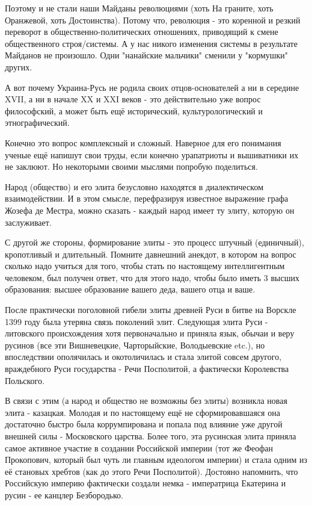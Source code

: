 \begin{itemize}
\begin{itemize}
Поэтому и не стали наши Майданы революциями (хоть На граните, хоть Оранжевой,
хоть Достоинства). Потому что, революция - это коренной и резкий переворот в
общественно-политических отношениях, приводящий к смене общественного
строя/системы. А у нас никого изменения системы в результате Майданов не
произошло. Одни "нанайские мальчики" сменили у "кормушки" других.

А вот почему Украина-Русь не родила своих отцов-основателей а ни в середине
XVII, а ни в начале XX и XXI веков - это действительно уже вопрос философский,
а может быть ещё исторический, культурологический и этнографический.

Конечно это вопрос комплексный и сложный. Наверное для его понимания ученые ещё
напишут свои труды, если конечно урапатриоты и вышиватники их не заклюют. Но
некоторыми своими мыслями попробую поделиться.

Народ (общество) и его элита безусловно находятся в диалектическом
взаимодействии. И в этом смысле, перефразируя известное выражение графа Жозефа
де Местра, можно сказать - каждый народ имеет ту элиту, которую он заслуживает.

С другой же стороны, формирование элиты - это процесс штучный (единичный),
кропотливый и длительный. Помните давнешний анекдот, в котором на вопрос
сколько надо учиться для того, чтобы стать по настоящему интеллигентным
человеком, был получен ответ, что для этого надо, чтобы было иметь 3 высших
образования: высшее образование вашего деда, вашего отца и ваше.

После практически поголовной гибели элиты древней Руси в битве на Ворскле 1399
году была утеряна связь поколений элит. Следующая элита Руси - литовского
происхождения хотя первоначально и приняла язык, обычаи и веру русинов (все эти
Вишневецкие, Чарторыйские, Володыевские etc.), но впоследствии ополячилась и
окотоличилась и стала элитой совсем другого, враждебного Руси государства -
Речи Посполитой, а фактически Королевства Польского.

В связи с этим (а народ и общество не возможны без элиты) возникла новая элита
- казацкая. Молодая и по настоящему ещё не сформировавшаяся она достаточно
быстро была коррумпирована и попала под влияние уже другой внешней силы -
Московского царства. Более того, эта русинская элита приняла самое активное
участие в создании Российской империи (тот же Феофан Прокопович, который был
чуть ли главным идеологом империи) и стала одним из её становых хребтов (как до
этого Речи Посполитой). Достояно напомнить, что Российскую империю фактически
создали немка - императрица Екатерина и русин - ее канцлер Безбородько.


\end{itemize}
\end{itemize}
